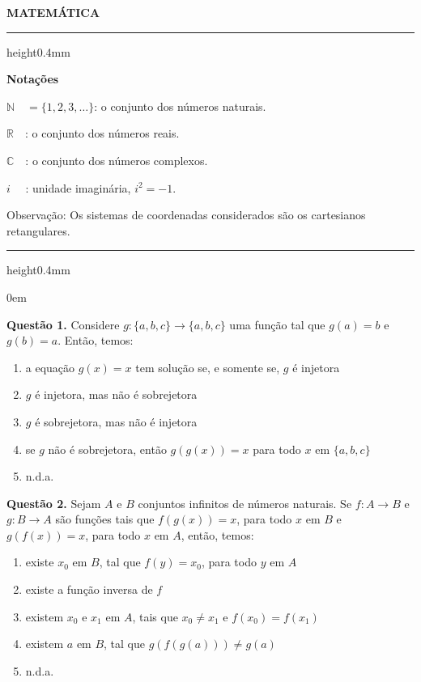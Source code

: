 \documentclass[11pt]{article}
\newcommand*\varhrulefill[1][0.4pt]{\leavevmode\leaders\hrule height#1\hfill\kern0pt}
\begin{document}
\begin{center}
    \textbf{MATEMÁTICA}
\end{center}

\noindent\varhrulefill[0.4mm]

\vspace{6pt}

\noindent \textbf{Notações}

\vspace{6pt}

$\mathbb{N}\quad = \{ 1,2,3, \dots \}$: o conjunto dos números naturais.

$\mathbb{R}\quad$: o conjunto dos números reais.

$\mathbb{C}\quad$: o conjunto dos números complexos.

$i \, \, \quad$: unidade imaginária, $i^2 = -1$.

\vspace{6pt}

\noindent Observação: Os sistemas de coordenadas considerados são os cartesianos retangulares.

\noindent\varhrulefill[0.4mm]

\vspace{12pt}

\parindent0em

\textbf{Questão 1.} Considere $g:\{a,b,c\} \rightarrow \{a,b,c\}$ uma função tal que $g(a) = b$ e $g(b) = a$. Então, temos:

\begin{enumerate}[\bf A (\quad)]
	\item a equação $g(x) = x$ tem solução se, e somente se, $g$ é injetora
    \item $g$ é injetora, mas não é sobrejetora
    \item $g$ é sobrejetora, mas não é injetora
    \item se $g$ não é sobrejetora, então $g(g(x)) = x$ para todo $x$ em $\{a,b,c\}$
    \item n.d.a.
\end{enumerate}


\textbf{Questão 2.} Sejam $A$ e $B$ conjuntos infinitos de números naturais. Se $f : A \rightarrow B$ e $g : B \rightarrow A$ são funções tais que $f(g(x)) = x$, para todo $x$ em $B$ e $g(f(x)) = x$, para todo $x$ em $A$, então, temos:  

\begin{enumerate}[\bf A (\quad)]
	\item existe $x_0$ em $B$, tal que $f(y) = x_0$, para todo $y$ em $A$
    \item existe a função inversa de $f$
    \item existem $x_0$ e $x_1$ em $A$, tais que $x_0 \neq x_1$ e $f(x_0) = f(x_1)$
    \item existem $a$ em $B$, tal que $g(f(g(a))) \neq g(a)$
    \item n.d.a.
\end{enumerate}
\end{document}
